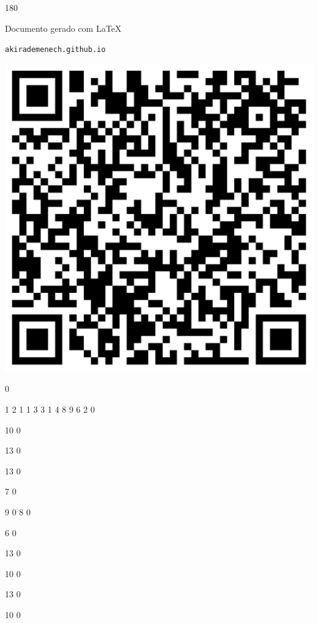 \documentclass[12pt]{article}
\begin{document}
	\begin{turn}{180}	
		\begin{minipage}{\textwidth}		  
		  Documento gerado com \LaTeX			
		  
		  \texttt{akirademenech.github.io}

		  \includegraphics[height=0.3\textheight]{2e-2.pdf}

		\end{minipage}	
	\end{turn}  
		  
		\vfill  
		  
{
	0	%

	1	%
	2	%
	1	%
	1	%
	3	%
	3	%
	1	%
	4	%
	8	%
	9	%
	6	%
	2	%
	0	%

	10	%
	0	%

	13	%
	0	%

	13	%
	0	%

	7	%
	0	%

	9	%
	0	%
	8	%
	0	%

	6	%
	0	%

	13	%
	0	%

	10	%
	0	%

	13	%
	0	%

	10	%
	0	%

}	  
		    	
\end{document}
